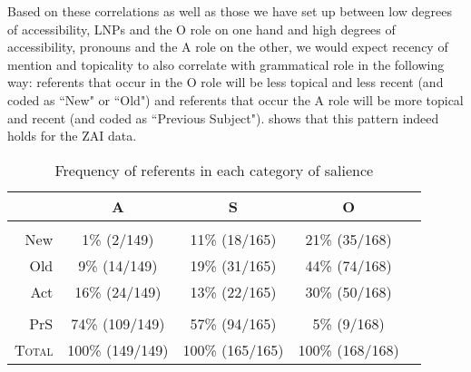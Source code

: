 Based on these correlations as well as those we have set up between low degrees of accessibility, LNPs and the O role on one hand and high degrees of accessibility, pronouns and the A role on the other, we would expect recency of mention and topicality to also correlate with grammatical role in the following way: referents that occur in the O role will be less topical and less recent (and coded as ``New" or ``Old") and referents that occur the A role will be more topical and recent (and coded as ``Previous Subject").  shows that this pattern indeed holds for the ZAI data.
\begin{table}[htp]
\begin{center}
\caption{\small{Frequency of referents in each category of salience}}
\begin{tabular}{| r | c | c | c | c |}\hline
  & \textsc{A} & \textsc{S} & \textsc{O} \\
\hline
 & & & \\
 New & 1{\%} (2/149) & 11{\%} (18/165) & 21{\%} (35/168)   \\
\hline
 Old & 9{\%} (14/149) & 19{\%} (31/165) & 44{\%} (74/168)  \\
\hline 
  Act & 16{\%} (24/149) & 13{\%} (22/165) & 30{\%} (50/168)  \\
\hline
 & & & \\
 PrS & 74{\%} (109/149) & 57{\%} (94/165) & 5{\%} (9/168) \\
\hline
 \textsc{Total} & 100{\%} (149/149)  & 100{\%} (165/165)  &  100{\%} (168/168)\\
\hline
\end{tabular}\\
\label{totalsalience1}
\end{center}
\end{table}


